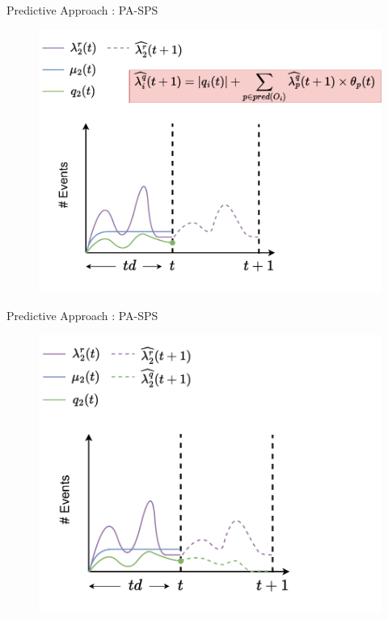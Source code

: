 \begin{frame}{Predictive Approach : PA-SPS}
\begin{figure}
    \centering
    \includegraphics[scale=0.63]{images/concepts/predictive/PA-SPS-Prediction-12.pdf}
\end{figure}
\end{frame}

\begin{frame}{Predictive Approach : PA-SPS}
\begin{figure}
    \centering
    \includegraphics[scale=0.63]{images/concepts/predictive/PA-SPS-Prediction-13.pdf}
\end{figure}
\end{frame}

